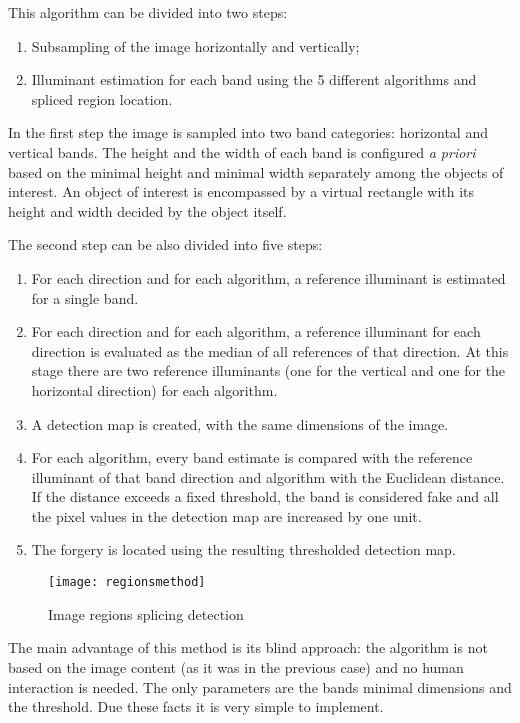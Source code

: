 This algorithm can be divided into two steps:
\begin{enumerate}
\item Subsampling of the image horizontally and vertically;
\item Illuminant estimation for each band using the 5 different algorithms and spliced region location.
\end{enumerate}

In the first step the image is sampled into two band categories: horizontal and vertical bands. The height and the width of each band is configured \emph{a priori} based on the minimal height and minimal width separately among the objects of interest. An object of interest is encompassed by a virtual rectangle with its height and width decided by the object itself.

The second step can be also divided into five steps:

\begin{enumerate}
\item For each direction and for each algorithm, a reference illuminant is estimated for a single band.
\item For each direction and for each algorithm, a reference illuminant for each direction is evaluated as the median of all references of that direction. At this stage there are two reference illuminants (one for the vertical and one for the horizontal direction) for each algorithm.
\item A detection map is created, with the same dimensions of the image.
\item For each algorithm, every band estimate is compared with the reference illuminant of that band direction and algorithm with the Euclidean distance. If the distance exceeds a fixed threshold, the band is considered fake and all the pixel values in the detection map are increased by one unit.
\item The forgery is located using the resulting thresholded detection map.
\end{enumerate}

\begin{figure}[h!]
  \centering
    \texttt{[image: regionsmethod]}
    \caption{Image regions splicing detection}
    \label{fig:regionsmethod}
\end{figure}

The main advantage of this method is its blind approach: the algorithm is not based on the image content (as it was in the previous case) and no human interaction is needed. The only parameters are the bands minimal dimensions and the threshold. Due these facts it is very simple to implement.

